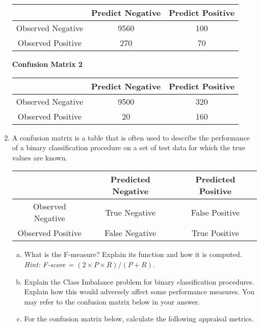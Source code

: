 \documentclass[a4paper,12pt]{article}
\begin{document}
\begin{enumerate}
\begin{center}
	\begin{tabular}{|c||c|c|}
		\hline 
		& Predict Negative & Predict Positive \\ \hline  \hline 
		Observed Negative & 9560 &  100 \\ \hline 
		Observed Positive & 270 & 70 \\ \hline 
	\end{tabular} 
\end{center}
\noindent \textbf{Confusion Matrix 2}
\begin{center}
	\begin{tabular}{|c||c|c|}
		\hline 
		& Predict Negative & Predict Positive \\ \hline  \hline 
		Observed Negative & 9500 &  320 \\ \hline 
		Observed Positive & 20 & 160 \\ \hline 
	\end{tabular} 
\end{center}


\item A confusion matrix is a table that is often used to describe the performance of a binary classification procedure on a set of test data for which the true values are known.
\begin{center}
\begin{tabular}{|c|c|c|}
\hline  & Predicted Negative & Predicted Positive \\ 
\hline Observed Negative & True Negative & False Positive \\ 
\hline Observed Positive & False Negative & True Positive \\ 
\hline 
\end{tabular} 
\end{center}
\begin{enumerate}[(a)]
\item  What is the F-measure? Explain its function and how it is computed.\\ 
\noindent \textit{ Hint: F-score = $(2 \times P \times R) / (P + R)$.}

\item Explain the Class Imbalance problem for binary classification procedures. Explain how this would adversely affect some performance measures. You may refer to the confusion matrix below in your answer.



 \item %
 For the confusion matrix below, calculate the following appraisal metrics.


\end{enumerate}
\end{enumerate}
\end{document}
